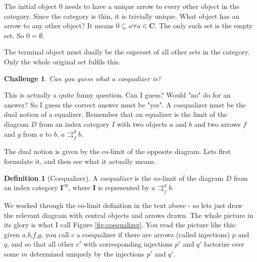 \documentclass{article}
\newcommand {\cat}{%
\mathbf%
}
\theoremstyle{definition}
\newtheorem{ch}{Challenge}
\newtheorem{defn}{Definition}[ch]
\begin{document}
The initial object $0$ needs to have a unique arrow to every other object in the category. Since the category is thin, it is trivially unique. What object has an arrow to any other object? It means $0 \subseteq a \forall a \in \cat C$. The only such set is the empty set. So $0 = \emptyset$.

The terminal object must dually be the superset of all other sets in the category. Only the whole original set fulfils this.






















\begin{ch}\textit{Can you guess what a coequalizer is?}\end{ch}

This is actually a quite funny question. Can I guess? Would "no" do for an answer? So I guess the correct answer must be "yes". A coequalizer must be the dual notion of a equalizer. Remember that an equalizer is the limit of the diagram $D$ from an index category $I$ with two objects $a$ and $b$ and two arrows $f$ and $g$ from $a$ to $b$, $a\rightrightarrows_f^g b$. 

The dual notion is given by the co-limit of the opposite diagram. Lets first formulate it, and then see what it actually means. 

\begin{defn}[Coequalizer]
A \emph{coequalizer} is the co-limit of the diagram $D$ from an index category $\cat I^{op}$, where $\cat I$ is represented by $a\rightrightarrows_f^g b$.
\end{defn}

We worked through the co-limit definition in the text above - so lets just draw the relevant diagram with central objects and arrows drawn. The whole picture in its glory is what I call Figure \ref{fig:coequalizer}. You read the picture like this: given $a$,$b$,$f$,$g$, you call $c$ a coequalizer if there are arrows (called injections) $p$ and $q$, and so that all other $c'$ with corresponding injections $p'$ and $q'$ factorize over some  $m$ determined uniquely by the injections $p'$ and $q'$.
\end{document}
